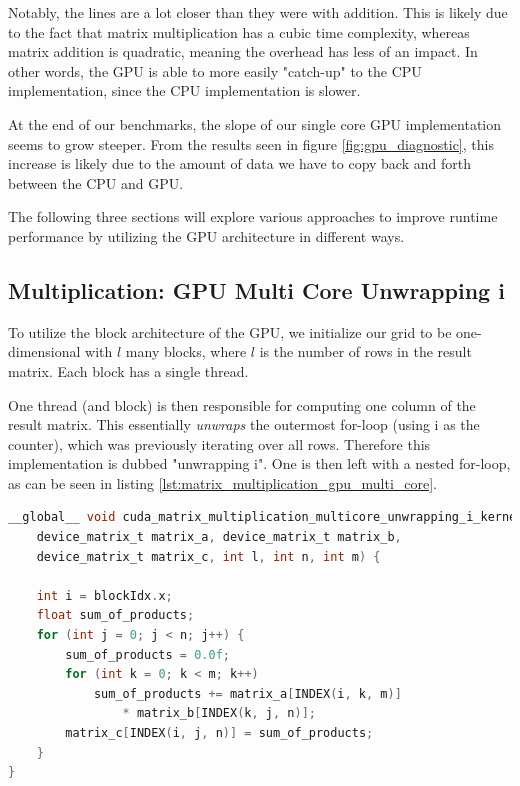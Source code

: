 Notably, the lines are a lot closer than they were with addition. This is likely due to the fact that matrix multiplication has a cubic time complexity, whereas matrix addition is quadratic, meaning the overhead has less of an impact. In other words, the GPU is able to more easily "catch-up" to the CPU implementation, since the CPU implementation is slower.

At the end of our benchmarks, the slope of our single core GPU implementation seems to grow steeper. From the results seen in figure \ref{fig:gpu_diagnostic}, this increase is likely due to the amount of data we have to copy back and forth between the CPU and GPU.

The following three sections will explore various approaches to improve runtime performance by utilizing the GPU architecture in different ways.

\subsection{Multiplication: GPU Multi Core Unwrapping i}

To utilize the block architecture of the GPU, we initialize our grid to be one-dimensional with $l$ many blocks, where $l$ is the number of rows in the result matrix. Each block has a single thread.

One thread (and block) is then responsible for computing one column of the result matrix. This essentially \textit{unwraps} the outermost for-loop (using i as the counter), which was previously iterating over all rows. Therefore this implementation is dubbed "unwrapping i". One is then left with a nested for-loop, as can be seen in listing \ref{lst:matrix_multiplication_gpu_multi_core}.

\begin{lstlisting}[language=C, caption={Multi Core Matrix Multiplication}, label={lst:matrix_multiplication_gpu_multi_core}]
__global__ void cuda_matrix_multiplication_multicore_unwrapping_i_kernel(
    device_matrix_t matrix_a, device_matrix_t matrix_b,
    device_matrix_t matrix_c, int l, int n, int m) {

    int i = blockIdx.x;
    float sum_of_products;
    for (int j = 0; j < n; j++) {
        sum_of_products = 0.0f;
        for (int k = 0; k < m; k++)
            sum_of_products += matrix_a[INDEX(i, k, m)] 
                * matrix_b[INDEX(k, j, n)];
        matrix_c[INDEX(i, j, n)] = sum_of_products;
    }
}
\end{lstlisting}

